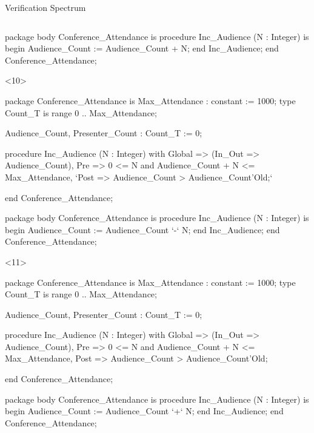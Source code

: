 \documentclass{beamer}
\begin{document}
\begin{frame}[fragile]{Verification Spectrum}
\begin{columns}
\begin{column}{9cm}
\begin{onlyenv}
\begin{pxcode}[language=SPARK,style=magic,gobble=8]
        package body Conference_Attendance
        is
           procedure Inc_Audience (N : Integer)
           is
           begin
              Audience_Count := Audience_Count + N;
           end Inc_Audience;
        end Conference_Attendance;
      \end{pxcode}
      \end{onlyenv}

      \begin{onlyenv}<10>
      \begin{pxcode}[language=SPARK,style=magic,gobble=8]
        package Conference_Attendance
        is
           Max_Attendance : constant := 1000;
           type Count_T is range 0 .. Max_Attendance;

           Audience_Count, Presenter_Count : Count_T := 0;

           procedure Inc_Audience (N : Integer)
           with Global => (In_Out => Audience_Count),
                Pre    => 0 <= N and Audience_Count + N <= Max_Attendance,
                `Post   => Audience_Count > Audience_Count'Old;`

        end Conference_Attendance;

        package body Conference_Attendance
        is
           procedure Inc_Audience (N : Integer)
           is
           begin
              Audience_Count := Audience_Count `-` N;
           end Inc_Audience;
        end Conference_Attendance;
      \end{pxcode}
      \end{onlyenv}

      \begin{onlyenv}<11>
      \begin{pxcode}[language=SPARK,style=magic,gobble=8]
        package Conference_Attendance
        is
           Max_Attendance : constant := 1000;
           type Count_T is range 0 .. Max_Attendance;

           Audience_Count, Presenter_Count : Count_T := 0;

           procedure Inc_Audience (N : Integer)
           with Global => (In_Out => Audience_Count),
                Pre    => 0 <= N and Audience_Count + N <= Max_Attendance,
                Post   => Audience_Count > Audience_Count'Old;

        end Conference_Attendance;

        package body Conference_Attendance
        is
           procedure Inc_Audience (N : Integer)
           is
           begin
              Audience_Count := Audience_Count `+` N;
           end Inc_Audience;
        end Conference_Attendance;
      \end{pxcode}
      \end{onlyenv}



\end{column}
\end{columns}
\end{frame}
\end{document}
